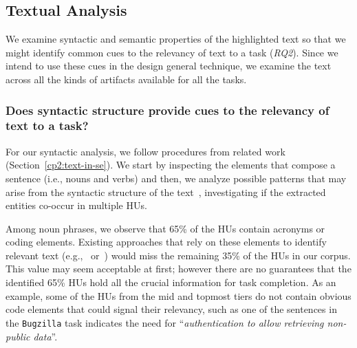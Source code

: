
\subsection{Textual Analysis}


We examine syntactic and semantic properties 
of the highlighted text so that 
we might identify
common cues to the relevancy of text to a task (\textit{RQ2}).
Since we intend to use these cues 
in the design general technique, 
we examine the text across 
all the kinds of artifacts 
available for all the tasks. 




 





\subsubsection{Does syntactic structure provide cues to the relevancy of text to a task?}
\label{cp3:syntactic-analysis}


For our syntactic analysis, we follow procedures from related work (Section~\ref{cp2:text-in-se}).
We start by inspecting the elements that compose a sentence (i.e., nouns and verbs)
and then, we analyze possible patterns that may arise from the syntactic structure of the text~\cite{Robillard2015},
investigating if the extracted entities co-occur in multiple HUs.






Among noun phrases, we observe that 65\% of the HUs contain acronyms or coding elements.
Existing approaches that rely on these elements to identify relevant text (e.g.,~\cite{Robillard2015} or~\cite{Jiang2016b}) would miss the remaining 35\% of the HUs in our corpus.
This value may seem acceptable at first; however there are no guarantees that
the identified 65\% HUs hold all the crucial information for task completion.
As an example, some of the HUs from the mid and topmost tiers 
do not contain obvious code elements that could signal their relevancy,
such as one of the sentences in the \texttt{Bugzilla} task indicates the need for ``\textit{authentication to allow retrieving non-public data}''.





